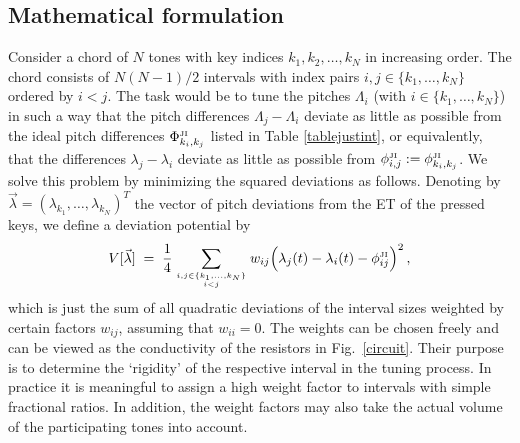 \subsection{Mathematical formulation}
Consider a chord of $N$ tones with key indices $k_1,k_2,\ldots,k_N$ in increasing order. The chord consists of $N(N-1)/2$ intervals with index pairs $i,j \in \{k_1,\ldots,k_N\}$ ordered by $i<j$. The task would be to tune the pitches $\Lambda_i$ (with $i\in\{k_1,\ldots,k_N\}$) in such a way that the pitch differences $\Lambda_j-\Lambda_i$  deviate as little as possible from the ideal pitch differences $\Phi^{\rm\scriptscriptstyle JI}_{k_i,k_j}$ listed in Table \ref{tablejustint}, or equivalently, that the differences $\lambda_j-\lambda_i$ deviate as little as possible from $\phi^{\rm\scriptscriptstyle JI}_{i,j}:=\phi^{\rm\scriptscriptstyle JI}_{k_i,k_j}$. We solve this problem by minimizing the squared deviations as follows. Denoting by $\vec\lambda=(\lambda_{k_1},\ldots,\lambda_{k_N})^T$ the vector of pitch deviations from the ET of the pressed keys, we define a deviation potential by
%
\begin{equation}
\label{V1}
V[\vec\lambda] \;=\; \frac14 \sum_{i,j\in \{k_1,\ldots,k_N\} \atop i<j} w_{ij} \Bigl( \lambda_j(t)-\lambda_i(t)-\phi^{\rm\scriptscriptstyle JI}_{ij}\Bigr)^2 \,,
\end{equation}
%
which is just the sum of all quadratic deviations of the interval sizes weighted by certain factors $w_{ij}$, assuming that $w_{ii}=0$. The weights can be chosen freely and can be viewed as the conductivity of the resistors in Fig.~\ref{circuit}. Their purpose is to determine the `rigidity' of the respective interval in the tuning process. In practice it is meaningful to assign a high weight factor to intervals with simple fractional ratios. In addition, the weight factors may also take the actual volume of the participating tones into account. 

